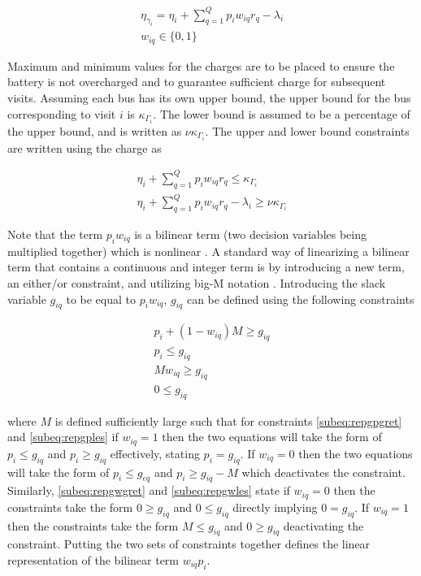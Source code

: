 \documentclass[letterpaper, 10pt, conference]{IEEEtran}
\begin{document}
\begin{subequations}
\begin{align}
    \eta_{\gamma_i} = \eta_i + \sum_{q=1}^Q p_i w_{iq} r_q - \lambda_i \\
    w_{iq} \in \{0,1\}
\end{align}
\end{subequations}

Maximum and minimum values for the charges are to be placed to ensure the battery is not overcharged and to guarantee
sufficient charge for subsequent visits. Assuming each bus has its own upper bound, the upper bound for the bus
corresponding to visit $i$ is $\kappa_{\Gamma_i}$. The lower bound is assumed to be a percentage of the upper bound, and is
written as $\nu \kappa_{\Gamma_i}$. The upper and lower bound constraints are written using the charge as

\begin{subequations}
\begin{align}
    \eta_i + \sum_{q=1}^Q p_i w_{iq} r_q \leq \kappa_{\Gamma_i}                 \\
    \eta_i + \sum_{q=1}^Q p_i w_{iq} r_q - \lambda_i \geq \nu \kappa_{\Gamma_i}
\end{align}
\end{subequations}

Note that the term $p_i w_{iq}$ is a bilinear term (two decision variables being multiplied together) which is nonlinear
\cite{Rodriguez2013}. A standard way of linearizing a bilinear term that contains a continuous and integer term is by
introducing a new term, an either/or constraint, and utilizing big-M notation \cite{Chen2010,Rodriguez2013}. Introducing
the slack variable $g_{iq}$ to be equal to $p_i w_{iq}$, $g_{iq}$ can be defined using the following constraints

\begin{subequations}
\begin{align}
    p_i + (1 - w_{iq})M \geq g_{iq}  \label{subeq:repgpgret} \\
    p_i \leq g_{iq}                 \label{subeq:repgples} \\
    Mw_{iq} \geq g_{iq}              \label{subeq:repgwgret} \\
    0 \leq g_{iq}                   \label{subeq:repgwles}
\end{align}
\end{subequations}

\noindent
where $M$ is defined sufficiently large such that for constraints \eqref{subeq:repgpgret} and \eqref{subeq:repgples} if
$w_{iq} = 1$ then the two equations will take the form of $p_i \leq g_{iq}$ and $p_i \geq g_{iq}$ effectively, stating $p_i =
g_{iq}$. If $w_{iq} = 0$ then the two equations will take the form of $p_i \leq g_{eq}$ and $p_i \geq g_{iq} - M$ which
deactivates the constraint. Similarly, \eqref{subeq:repgwgret} and \eqref{subeq:repgwles} state if $w_{iq} = 0$ then the
constraints take the form $0 \geq g_{iq}$ and $0 \leq g_{iq}$ directly implying $0 = g_{iq}$. If $w_{iq} = 1$ then the
constraints take the form $M \leq g_{iq}$ and $0 \geq g_{iq}$ deactivating the constraint. Putting the two sets of constraints
together defines the linear representation of the bilinear term $w_{iq} p_i$.
\end{document}
